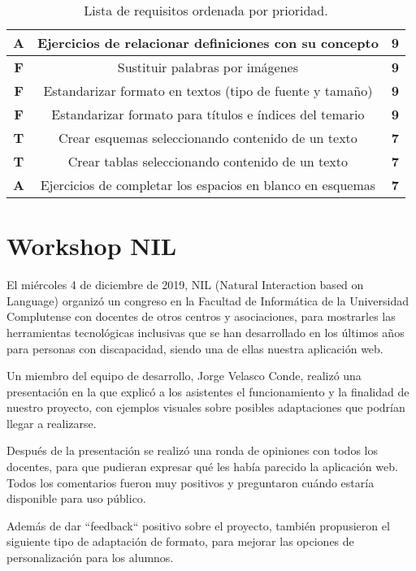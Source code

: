 \begin{table}
{\begin{tabular}{| c | c | c |}
\textbf{A} & Ejercicios de relacionar definiciones con su concepto & \textbf{9} \\ \hline
\textbf{F} & Sustituir palabras por im\'agenes & \textbf{9} \\ \hline
\textbf{F} & Estandarizar formato en textos (tipo de fuente y tama\~{n}o) & \textbf{9} \\ \hline
\textbf{F} & Estandarizar formato para t\'itulos e \'indices del temario & \textbf{9} \\ \hline
\textbf{T} & Crear esquemas seleccionando contenido de un texto & \textbf{7} \\ \hline
\textbf{T} & Crear tablas seleccionando contenido de un texto & \textbf{7} \\ \hline
\textbf{A} & Ejercicios de completar los espacios en blanco en esquemas & \textbf{7} \\ \hline
\end{tabular}
}
\caption{Lista de requisitos ordenada por prioridad.}
\end{table}

\section{Workshop NIL}

    El mi\'ercoles 4 de diciembre de 2019, NIL (Natural Interaction based on Language) organiz\'o un congreso en la Facultad de Inform\'atica de la Universidad Complutense con docentes de otros centros y asociaciones, para mostrarles las herramientas tecnol\'ogicas inclusivas que se han desarrollado en los \'ultimos a\~{n}os para personas con discapacidad, siendo una de ellas nuestra aplicaci\'on web.

    Un miembro del equipo de desarrollo, Jorge Velasco Conde, realiz\'o una presentaci\'on en la que explic\'o a los asistentes el funcionamiento y la finalidad de nuestro proyecto, con ejemplos visuales sobre posibles adaptaciones que podr\'ian llegar a realizarse.

    Despu\'es de la presentaci\'on se realiz\'o una ronda de opiniones con todos los docentes, para que pudieran expresar qu\'e les hab\'ia parecido la aplicaci\'on web. Todos los comentarios fueron muy positivos y preguntaron cu\'ando estar\'ia disponible para uso p\'ublico.

    Adem\'as de dar ``feedback`` positivo sobre el proyecto, tambi\'en propusieron el siguiente tipo de adaptaci\'on de formato, para mejorar las opciones de personalizaci\'on para los alumnos.

